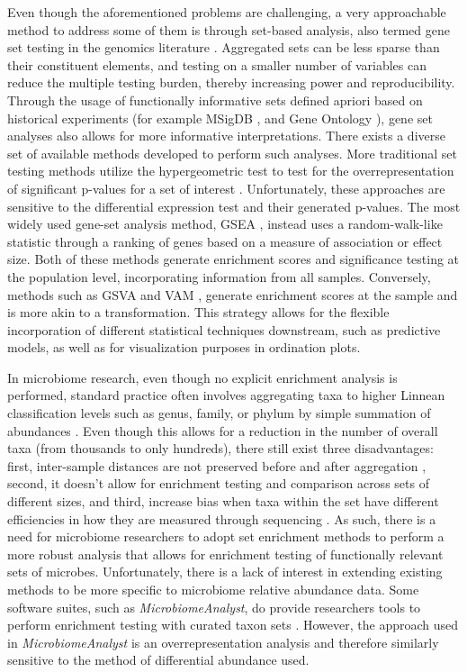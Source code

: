 \documentclass[10pt,letterpaper]{article}
\begin{document}
Even though the aforementioned problems are challenging, a very approachable method to address some of them is through set-based analysis, also termed gene set testing in the genomics literature \cite{khatri2012, goeman2007}. Aggregated sets can be less sparse than their constituent elements, and testing on a smaller number of variables can reduce the multiple testing burden, thereby increasing power and reproducibility. Through the usage of functionally informative sets defined apriori based on historical experiments (for example MSigDB \cite{subramanian2005}, and Gene Ontology \cite{ashburner2000}), gene set analyses also allows for more informative interpretations. There exists a diverse set of available methods developed to perform such analyses. More traditional set testing methods utilize the hypergeometric test to test for the overrepresentation of significant p-values for a set of interest \cite{goeman2007}. Unfortunately, these approaches are sensitive to the differential expression test and their generated p-values. The most widely used gene-set analysis method, GSEA \cite{subramanian2005}, instead uses a random-walk-like statistic through a ranking of genes based on a measure of association or effect size. Both of these methods generate enrichment scores and significance testing at the population level, incorporating information from all samples. Conversely, methods such as GSVA \cite{hanzelmann2013} and VAM \cite{frost2020a}, generate enrichment scores at the sample and is more akin to a transformation. This strategy allows for the flexible incorporation of different statistical techniques downstream, such as predictive models, as well as for visualization purposes in ordination plots.  

In microbiome research, even though no explicit enrichment analysis is performed, standard practice often involves aggregating taxa to higher Linnean classification levels such as genus, family, or phylum by simple summation of abundances \cite{mclaren2019}. Even though this allows for a reduction in the number of overall taxa (from thousands to only hundreds), there still exist three disadvantages: first, inter-sample distances are not preserved before and after aggregation \cite{egozcue2005}, second, it doesn't allow for enrichment testing and comparison across sets of different sizes, and third, increase bias when taxa within the set have different efficiencies in how they are measured through sequencing \cite{mclaren2019}. As such, there is a need for microbiome researchers to adopt set enrichment methods to perform a more robust analysis that allows for enrichment testing of functionally relevant sets of microbes. Unfortunately, there is a lack of interest in extending existing methods to be more specific to microbiome relative abundance data. Some software suites, such as \emph{MicrobiomeAnalyst}, do provide researchers tools to perform enrichment testing with curated taxon sets \cite{chong2020}. However, the approach used in \emph{MicrobiomeAnalyst} is an overrepresentation analysis and therefore similarly sensitive to the method of differential abundance used. 
\end{document}
